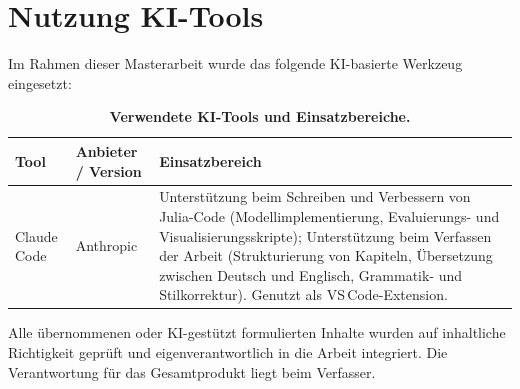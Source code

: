 \chapter{Nutzung KI-Tools}
\label{app:ki_tools}

Im Rahmen dieser Masterarbeit wurde das folgende KI-basierte Werkzeug eingesetzt:

\begin{table}[htbp]
\centering
\caption{\textbf{Verwendete KI-Tools und Einsatzbereiche.}}
\label{tab:ki_tools}
\begin{tabular}{p{3cm}p{3cm}p{8cm}}
\toprule
\textbf{Tool} & \textbf{Anbieter / Version} & \textbf{Einsatzbereich} \\
\midrule
Claude Code & Anthropic &
    Unterstützung beim Schreiben und Verbessern von Julia-Code
    (Modellimplementierung, Evaluierungs- und Visualisierungsskripte);
    Unterstützung beim Verfassen der Arbeit (Strukturierung von Kapiteln,
    Übersetzung zwischen Deutsch und Englisch, Grammatik- und
    Stilkorrektur). Genutzt als VS\,Code-Extension. \\
\bottomrule
\end{tabular}
\end{table}

\noindent
Alle übernommenen oder KI-gestützt formulierten Inhalte wurden auf inhaltliche
Richtigkeit geprüft und eigenverantwortlich in die Arbeit integriert.
Die Verantwortung für das Gesamtprodukt liegt beim Verfasser.
